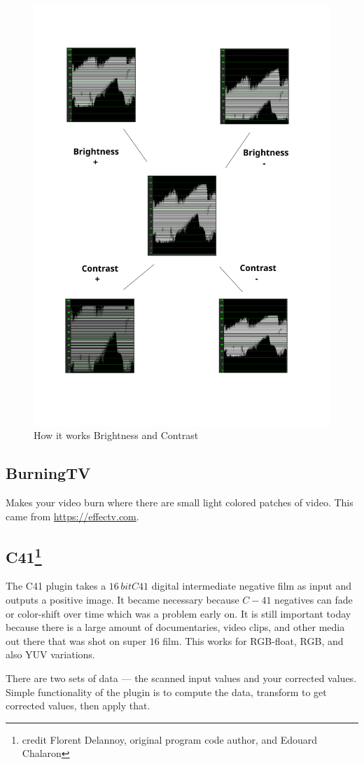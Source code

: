 \begin{figure}[htpb]
    \centering
    \includegraphics[width=0.6\linewidth]{images/brightness.png}
    \caption{How it works Brightness and Contrast}
    \label{fig:brightness}
\end{figure}

\subsection{BurningTV}%
\label{sub:burningtv}

Makes your video burn where there are small light colored patches of video. This came from \url{https://effectv.com}.

\subsection{C41\protect\footnote{credit Florent Delannoy, original program code author, and Edouard Chalaron}}%
\label{sub:c41}

The C41 plugin takes a $16\,bit C41$ digital intermediate negative film as input and outputs a positive image. It became necessary because $C-41$ negatives can fade or color-shift over time which was a problem early on. It is still important today because there is a large amount of documentaries, video clips, and other media out there that was shot on super $16$ film. This works for RGB-float, RGB, and also YUV variations.

There are two sets of data --- the scanned input values and your corrected values. Simple functionality of the plugin is to compute the data, transform to get corrected values, then apply that.

